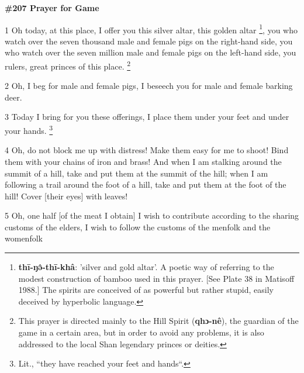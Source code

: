 
\textbf{\#207 Prayer for Game}

1 Oh today, at this place, I offer you this silver altar, this golden altar \footnote{\textbf{ thī-ŋə̂-thī-khâ}: 'silver and gold altar'. A poetic way of referring to the modest construction of bamboo used in this prayer. [See Plate 38 in Matisoff 1988.] The spirits are conceived of as powerful but rather stupid, easily deceived by hyperbolic language.},
you who watch over the seven thousand male and female pigs on the right-hand side,
you who watch over the seven million male and female pigs on the left-hand side,
you rulers, great princes of this place. \footnote{This prayer is directed mainly to the Hill Spirit (\textbf{qhɔ-nê}), the guardian of the game in a certain area, but in order to avoid any problems, it is also addressed to the local Shan legendary princes or deities.}

2 Oh, I beg for male and female pigs, I beseech you for male and female barking
deer.

3 Today I bring for you these offerings, I place them under your feet and under
your hands. \footnote{Lit., ``they have reached your feet and hands``.}

4 Oh, do not block me up with distress! Make them easy for me to shoot! Bind them
with your chains of iron and brass! And when I am stalking around the summit of
a hill, take and put them at the summit of the hill; when I am following a trail
around the foot of a hill, take and put them at the foot of the hill!  Cover [their
eyes] with leaves!

5 Oh, one half [of the meat I obtain] I wish to contribute according to the sharing
customs of the elders, I wish to follow the customs of the menfolk and the womenfolk
